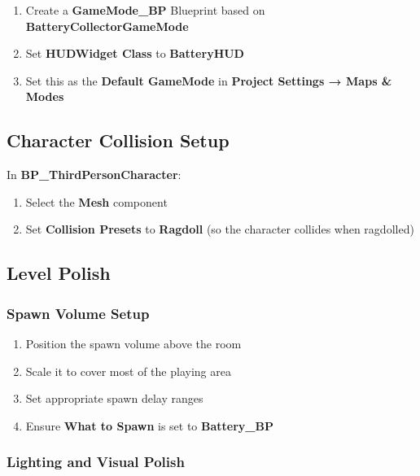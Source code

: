 \documentclass[
  letterpaper,
  DIV=11,
  numbers=noendperiod]{scrartcl}
\providecommand{\tightlist}{%
  \setlength{\itemsep}{0pt}\setlength{\parskip}{0pt}}
\begin{document}
\begin{enumerate}
\def\labelenumi{\arabic{enumi}.}
\tightlist
\item
  Create a \textbf{GameMode\_BP} Blueprint based on
  \textbf{BatteryCollectorGameMode}
\item
  Set \textbf{HUDWidget Class} to \textbf{BatteryHUD}
\item
  Set this as the \textbf{Default GameMode} in \textbf{Project Settings
  → Maps \& Modes}
\end{enumerate}

\subsection{Character Collision Setup}\label{character-collision-setup}

In \textbf{BP\_ThirdPersonCharacter}:

\begin{enumerate}
\def\labelenumi{\arabic{enumi}.}
\tightlist
\item
  Select the \textbf{Mesh} component
\item
  Set \textbf{Collision Presets} to \textbf{Ragdoll} (so the character
  collides when ragdolled)
\end{enumerate}

\subsection{Level Polish}\label{level-polish}

\subsubsection{Spawn Volume Setup}\label{spawn-volume-setup}

\begin{enumerate}
\def\labelenumi{\arabic{enumi}.}
\tightlist
\item
  Position the spawn volume above the room
\item
  Scale it to cover most of the playing area
\item
  Set appropriate spawn delay ranges
\item
  Ensure \textbf{What to Spawn} is set to \textbf{Battery\_BP}
\end{enumerate}

\subsubsection{Lighting and Visual
Polish}\label{lighting-and-visual-polish}
\end{document}
